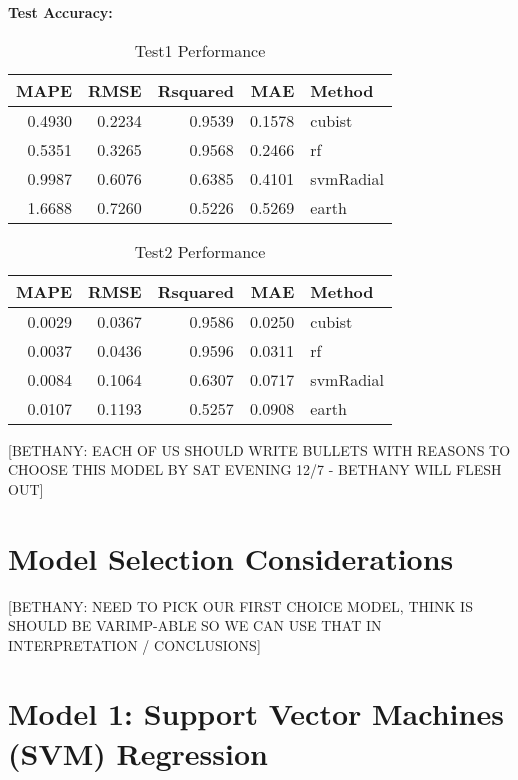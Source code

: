 \documentclass[]{report}
\begin{document}
\textbf{Test Accuracy:}

\begin{table}[H]

\caption{\label{tab:unnamed-chunk-7}Test1 Performance}
\centering
\fontsize{8}{10}\selectfont
\begin{tabular}[t]{rrrrl}
\toprule
MAPE & RMSE & Rsquared & MAE & Method\\
\midrule
\rowcolor{gray!6}  0.4930 & 0.2234 & 0.9539 & 0.1578 & cubist\\
0.5351 & 0.3265 & 0.9568 & 0.2466 & rf\\
\rowcolor{gray!6}  0.9987 & 0.6076 & 0.6385 & 0.4101 & svmRadial\\
1.6688 & 0.7260 & 0.5226 & 0.5269 & earth\\
\bottomrule
\end{tabular}
\end{table}

\begin{table}[H]

\caption{\label{tab:unnamed-chunk-7}Test2 Performance}
\centering
\fontsize{8}{10}\selectfont
\begin{tabular}[t]{rrrrl}
\toprule
MAPE & RMSE & Rsquared & MAE & Method\\
\midrule
\rowcolor{gray!6}  0.0029 & 0.0367 & 0.9586 & 0.0250 & cubist\\
0.0037 & 0.0436 & 0.9596 & 0.0311 & rf\\
\rowcolor{gray!6}  0.0084 & 0.1064 & 0.6307 & 0.0717 & svmRadial\\
0.0107 & 0.1193 & 0.5257 & 0.0908 & earth\\
\bottomrule
\end{tabular}
\end{table}

{[}BETHANY: EACH OF US SHOULD WRITE BULLETS WITH REASONS TO CHOOSE THIS
MODEL BY SAT EVENING 12/7 - BETHANY WILL FLESH OUT{]}

\hypertarget{model-selection-considerations}{%
\section{Model Selection
Considerations}\label{model-selection-considerations}}

{[}BETHANY: NEED TO PICK OUR FIRST CHOICE MODEL, THINK IS SHOULD BE
VARIMP-ABLE SO WE CAN USE THAT IN INTERPRETATION / CONCLUSIONS{]}

\hypertarget{model-1-support-vector-machines-svm-regression}{%
\section{Model 1: Support Vector Machines (SVM)
Regression}\label{model-1-support-vector-machines-svm-regression}}
\end{document}
